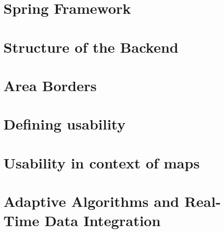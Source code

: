 \section{Spring Framework}


\section{Structure of the Backend}


\section{Area Borders}


\section{Defining usability}


\section{Usability in context of maps}



\newpage
\section{Adaptive Algorithms and Real-Time Data Integration}


